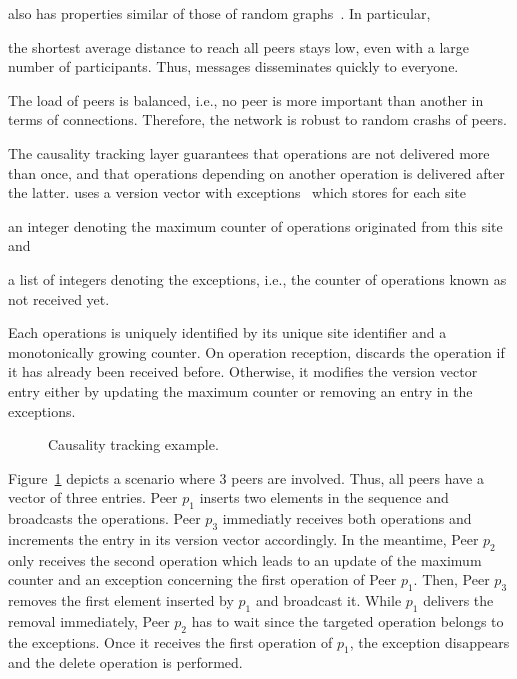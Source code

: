 \begin{asparadesc}
  \SPRAY also has properties similar of those of random
  graphs~\cite{erdos1959random}. In particular,
  \begin{inparaenum}[(i)]
  \item the shortest average distance to reach all peers stays low, even with a
    large number of participants. Thus, messages disseminates quickly to
    everyone.
  \item The load of peers is balanced, i.e., no peer is more important than
    another in terms of connections. Therefore, the network is robust to random
    crashs of peers.
  \end{inparaenum}

\item [The causality tracking layer] guarantees that operations are not
  delivered more than once, and that operations depending on another operation
  is delivered after the latter. \CRATE uses a version vector with
  exceptions~\cite{malkhi2007concise} which stores for each
  site
  \begin{inparaenum}[(i)]
  \item an integer denoting the maximum counter of operations originated from
    this site and
  \item a list of integers denoting the exceptions, i.e., the counter of
    operations known as not received yet.
  \end{inparaenum}

  Each operations is uniquely identified by its unique site identifier and a
  monotonically growing counter. On operation reception, \CRATE discards the
  operation if it has already been received before. Otherwise, it modifies the
  version vector entry either by updating the maximum counter or removing an
  entry in the exceptions.

  \begin{figure}
    
    \caption{\label{fig:timeline}Causality tracking example.}
  \end{figure}

  Figure~\ref{fig:timeline} depicts a scenario where 3 peers are involved. Thus,
  all peers have a vector of three entries. Peer $p_1$ inserts two elements in
  the sequence and broadcasts the operations. Peer $p_3$ immediatly receives
  both operations and increments the entry in its version vector accordingly.
  In the meantime, Peer $p_2$ only receives the second operation which leads to
  an update of the maximum counter and an exception concerning the first
  operation of Peer $p_1$. Then, Peer $p_3$ removes the first element inserted
  by $p_1$ and broadcast it. While $p_1$ delivers the removal immediately, Peer
  $p_2$ has to wait since the targeted operation belongs to the exceptions. Once
  it receives the first operation of $p_1$, the exception disappears and the
  delete operation is performed.


\end{asparadesc}
